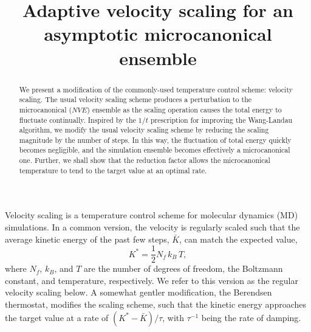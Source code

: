 \documentclass[reprint]{revtex4-1}
\begin{document}
\title{Adaptive velocity scaling for an asymptotic
microcanonical ensemble}
\author{}
\begin{abstract}
  We present a modification of the commonly-used
  temperature control scheme: velocity scaling.
  The usual velocity scaling scheme produces a perturbation to
  the microcanonical ($NVE$) ensemble
  as the scaling operation causes the total energy to fluctuate continually.
  Inspired by the $1/t$ prescription for improving the Wang-Landau algorithm,
  we modify the usual velocity scaling scheme
  by reducing the scaling magnitude by the number of steps.
  In this way, the fluctuation of total energy quickly becomes negligible,
  and the simulation ensemble becomes effectively a microcanonical one.
  Further, we shall show that the reduction factor
  allows the microcanonical temperature to tend to the target value
  at an optimal rate.
\end{abstract}

\maketitle



Velocity scaling is a temperature control scheme
for molecular dynamics (MD) simulations.
%
In a common version,
the velocity is regularly scaled such that the average
kinetic energy of the past few steps, $\bar K$,
can match the expected value\cite{frenkel},
%
\begin{equation}
  K^* = \frac{1}{2} N_f \, k_B \, T
  ,
  \label{eq:K_canon}
\end{equation}
%
where $N_f$, $k_B$, and $T$ are the number of degrees of freedom,
the Boltzmann constant, and temperature, respectively.
%
We refer to this version as the regular velocity scaling below.
%
A somewhat gentler modification, the Berendsen thermostat\cite{berendsen1984},
modifies the scaling scheme, such that
the kinetic energy approaches the target value at a rate of
$\left( K^* - \bar K \right)/\tau$,
with $\tau^{-1}$ being the rate of damping.
\end{document}
